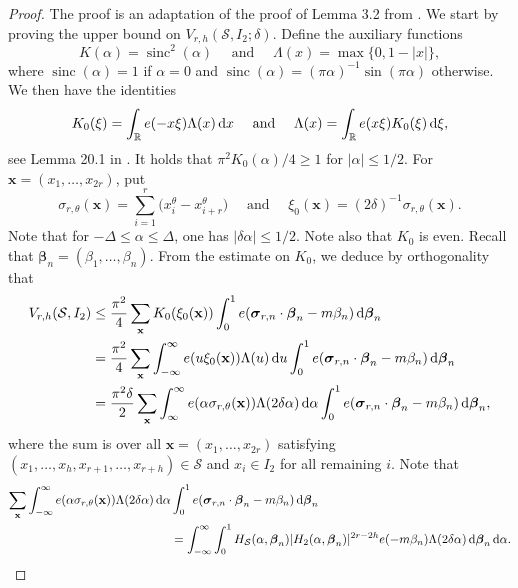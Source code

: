 \documentclass[11pt,reqno]{amsart}
\numberwithin{equation}{section}
\renewcommand{\d}{\,{\rm d}}
\begin{document}
\begin{proof} The proof is an adaptation of the proof of Lemma 3.2 from \cite{Poulias1}. We start by proving the upper bound on $V_{r,h}(\mathcal{S}, I_2; \delta) $. Define the auxiliary functions 
\[ K(\alpha) = \operatorname{sinc}^2(\alpha) \quad \text{ and } \quad \Lambda(x) = \max\{0, 1-|x|\}, \] where $\operatorname{sinc}(\alpha) = 1 $ if $\alpha =0$ and $\operatorname{sinc}(\alpha) = (\pi\alpha)^{-1}\sin(\pi\alpha)$
otherwise. We then have the identities
\[ K_0(\xi) = \int_{\mathbb{R}} e(-x\xi)\Lambda(x)\d x \quad \text{ and } \quad \Lambda(x) = \int_{\mathbb{R}} e(x\xi)K_0(\xi)\d\xi, \]
see Lemma 20.1 in \cite{DavBook}. It holds that $\pi^2K_0(\alpha)/4 \geq 1$ for $|\alpha|\leq 1/2$. For $\mathbf{x} = (x_1,\ldots,x_{2r})$, put 
\[ \sigma_{r,\theta}(\mathbf{x}) = \sum_{i=1}^r \big(x_i^{\theta}-x_{i+r}^{\theta}\big) \quad \text{ and } \quad \xi_0(\mathbf{x}) = (2\delta)^{-1} \sigma_{r,\theta}(\mathbf{x}). \]
Note that for $-\Delta \leq \alpha \leq \Delta$, one has $|\delta\alpha|\leq 1/2$. Note also that $K_0$ is even. Recall that $\boldsymbol{\beta}_n = (\beta_1,\ldots,\beta_n)$. From the estimate on $K_0$, we deduce by orthogonality that 
\begin{align*} 
V_{r,h}(\mathcal{S},I_2) & \leq \frac{\pi^2}{4} \sum_{\mathbf{x}} K_0(\xi_0(\mathbf{x})) \int_{0}^1 e(\boldsymbol{\sigma}_{r,n}\cdot\boldsymbol{\beta}_n-m\beta_n)\d\boldsymbol{\beta}_n 
\\ & = \frac{\pi^2}{4} \sum_{\mathbf{x}} \int_{-\infty}^{\infty} e(u\xi_0(\mathbf{x})) \Lambda(u)\d u \int_{0}^1 e(\boldsymbol{\sigma}_{r,n}\cdot\boldsymbol{\beta}_n-m\beta_n)\d\boldsymbol{\beta}_n 
\\
& = \frac{\pi^2\delta}{2} \sum_{\mathbf{x}} \int_{\infty}^{\infty} e(\alpha\sigma_{r,\theta}(\mathbf{x})) \Lambda(2\delta\alpha)\d \alpha \int_{0}^1 e(\boldsymbol{\sigma}_{r,n}\cdot\boldsymbol{\beta}_n-m\beta_n)\d\boldsymbol{\beta}_n, 
\end{align*}
where the sum is over all $\mathbf{x}=(x_1,\ldots,x_{2r})$ satisfying $(x_1,\ldots,x_h,x_{r+1},\ldots,x_{r+h}) \in \mathcal{S}$ and $x_i \in I_2$ for all remaining $i$. Note that 
\begin{align*} \sum_{\mathbf{x}} \int_{-\infty}^{\infty} e(\alpha\sigma_{r,\theta}(\mathbf{x})) \Lambda(2\delta\alpha)\d \alpha & \int_{0}^1 e(\boldsymbol{\sigma}_{r,n}\cdot\boldsymbol{\beta}_n-m\beta_n)\d\boldsymbol{\beta}_n 
\\ & = \int_{-\infty}^{\infty} \int_0^1 H_{\mathcal{S}}(\alpha,\boldsymbol{\beta}_n)|H_2(\alpha,\boldsymbol{\beta}_n)|^{2r-2h} e(-m\beta_n) \Lambda(2\delta\alpha) \d \boldsymbol{\beta}_n \d \alpha. 

\end{align*}
\end{proof}
\end{document}
